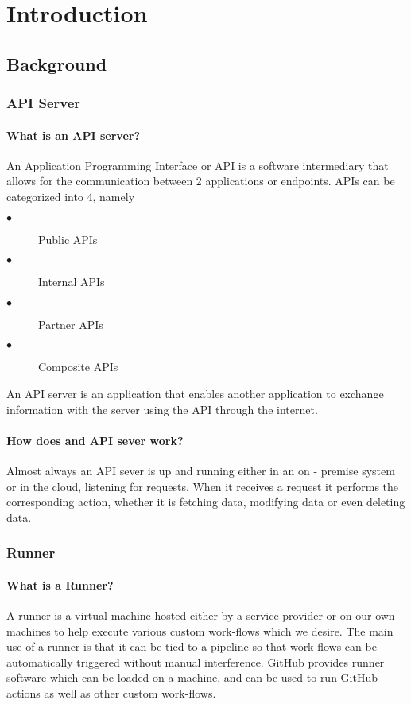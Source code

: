\chapter{Introduction} 
\label{Chapter1} 



\section{Background}
\subsection{API Server}
\subsubsection{What is an API server?}
An Application Programming Interface or API is a software intermediary that allows for the communication between 2 applications or endpoints. APIs can be categorized into 4, namely 
\begin{description}
\item[$\bullet$] Public APIs
\item[$\bullet$] Internal APIs
\item[$\bullet$] Partner APIs
\item[$\bullet$] Composite APIs
\end{description}


An API server is an application that enables another application to exchange information with the server using the API through the internet.
\subsubsection{How does and API sever work?}
Almost always an API sever is up and running either in an on - premise system or in the cloud, listening for requests. When it receives a request it performs the corresponding action, whether it is fetching data, modifying data or even deleting data.
\subsection{Runner}
\subsubsection{What is a Runner?}
A runner is a virtual machine hosted either by a service provider or on our own machines to help execute various custom work-flows which we desire. The main use of a runner is that it can be tied to a pipeline so that work-flows can be automatically triggered without manual interference. GitHub provides runner software which can be loaded on a machine, and can be used to run GitHub actions as well as other custom work-flows. 
